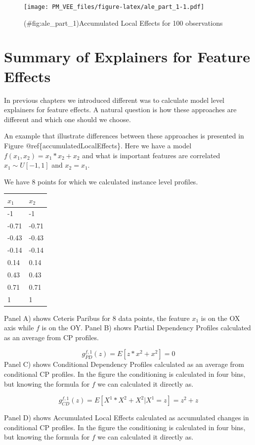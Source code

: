 \documentclass[12pt,]{krantz}
\theoremstyle{definition}
\theoremstyle{definition}
\theoremstyle{definition}
\theoremstyle{remark}
\begin{document}
\begin{figure}
\centering
\texttt{[image: PM\_VEE\_files/figure-latex/ale\_part\_1-1.pdf]}
\caption{(\#fig:ale\_part\_1)Accumulated Local Effects for 100
observations}
\end{figure}

\hypertarget{summaryFeatureEffects}{%
\section{Summary of Explainers for Feature
Effects}\label{summaryFeatureEffects}}

In previous chapters we introduced different was to calculate model
level explainers for feature effects. A natural question is how these
approaches are different and which one should we choose.

An example that illustrate differences between these approaches is
presented in Figure @ref\{accumulatedLocalEffects\}. Here we have a
model \(f(x_1, x_2) = x_1*x_2 + x_2\) and what is important features are
correlated \(x_1 \sim U[-1,1]\) and \(x_2 = x_1\).

We have 8 points for which we calculated instance level profiles.

\begin{longtable}[]{@{}ll@{}}
\toprule
\(x_1\) & \(x_2\)\tabularnewline
\midrule
\endhead
-1 & -1\tabularnewline
-0.71 & -0.71\tabularnewline
-0.43 & -0.43\tabularnewline
-0.14 & -0.14\tabularnewline
0.14 & 0.14\tabularnewline
0.43 & 0.43\tabularnewline
0.71 & 0.71\tabularnewline
1 & 1\tabularnewline
\bottomrule
\end{longtable}

Panel A) shows Ceteris Paribus for 8 data points, the feature \(x_1\) is
on the OX axis while \(f\) is on the OY. Panel B) shows Partial
Dependency Profiles calculated as an average from CP profiles.

\[
g_{PD}^{f,1}(z) = E[z*x^2 + x^2] = 0
\] Panel C) shows Conditional Dependency Profiles calculated as an
average from conditional CP profiles. In the figure the conditioning is
calculated in four bins, but knowing the formula for \(f\) we can
calculated it directly as.

\[
g_{CD}^{f,1}(z) = E[X^1*X^2 + X^2 | X^1 = z] = z^2+z
\]

Panel D) shows Accumulated Local Effects calculated as accumulated
changes in conditional CP profiles. In the figure the conditioning is
calculated in four bins, but knowing the formula for \(f\) we can
calculated it directly as.
\end{document}

